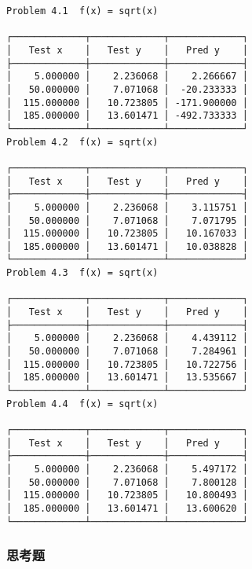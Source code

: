 \documentclass[11pt]{article}
\begin{document}
    \begin{verbatim}
Problem 4.1  f(x) = sqrt(x)

┌─────────────┬─────────────┬─────────────┐
│   Test x    │   Test y    │   Pred y    │
├─────────────┼─────────────┼─────────────┤
│    5.000000 │    2.236068 │    2.266667 │
│   50.000000 │    7.071068 │  -20.233333 │
│  115.000000 │   10.723805 │ -171.900000 │
│  185.000000 │   13.601471 │ -492.733333 │
└─────────────┴─────────────┴─────────────┘
Problem 4.2  f(x) = sqrt(x)

┌─────────────┬─────────────┬─────────────┐
│   Test x    │   Test y    │   Pred y    │
├─────────────┼─────────────┼─────────────┤
│    5.000000 │    2.236068 │    3.115751 │
│   50.000000 │    7.071068 │    7.071795 │
│  115.000000 │   10.723805 │   10.167033 │
│  185.000000 │   13.601471 │   10.038828 │
└─────────────┴─────────────┴─────────────┘
Problem 4.3  f(x) = sqrt(x)

┌─────────────┬─────────────┬─────────────┐
│   Test x    │   Test y    │   Pred y    │
├─────────────┼─────────────┼─────────────┤
│    5.000000 │    2.236068 │    4.439112 │
│   50.000000 │    7.071068 │    7.284961 │
│  115.000000 │   10.723805 │   10.722756 │
│  185.000000 │   13.601471 │   13.535667 │
└─────────────┴─────────────┴─────────────┘
Problem 4.4  f(x) = sqrt(x)

┌─────────────┬─────────────┬─────────────┐
│   Test x    │   Test y    │   Pred y    │
├─────────────┼─────────────┼─────────────┤
│    5.000000 │    2.236068 │    5.497172 │
│   50.000000 │    7.071068 │    7.800128 │
│  115.000000 │   10.723805 │   10.800493 │
│  185.000000 │   13.601471 │   13.600620 │
└─────────────┴─────────────┴─────────────┘
\end{verbatim}

    \hypertarget{ux601dux8003ux9898}{%
\subsubsection{思考题}\label{ux601dux8003ux9898}}
\end{document}
